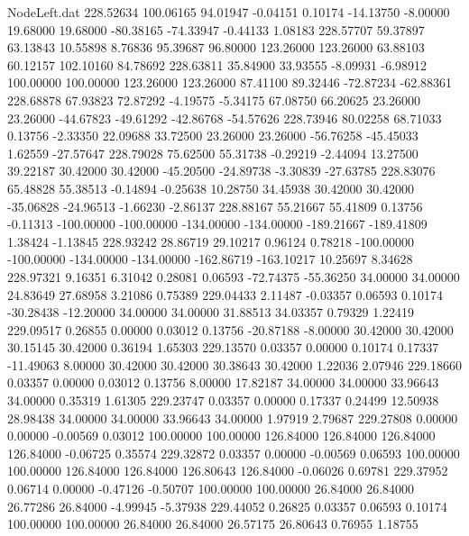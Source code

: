 \begin{filecontents}{NodeLeft.dat}
 228.52634  100.06165   94.01947    -0.04151    0.10174  -14.13750   -8.00000   19.68000   19.68000  -80.38165  -74.33947   -0.44133    1.08183
 228.57707   59.37897   63.13843    10.55898    8.76836   95.39687   96.80000  123.26000  123.26000   63.88103   60.12157  102.10160   84.78692
 228.63811   35.84900   33.93555    -8.09931   -6.98912  100.00000  100.00000  123.26000  123.26000   87.41100   89.32446  -72.87234  -62.88361
 228.68878   67.93823   72.87292    -4.19575   -5.34175   67.08750   66.20625   23.26000   23.26000  -44.67823  -49.61292  -42.86768  -54.57626
 228.73946   80.02258   68.71033     0.13756   -2.33350   22.09688   33.72500   23.26000   23.26000  -56.76258  -45.45033    1.62559  -27.57647
 228.79028   75.62500   55.31738    -0.29219   -2.44094   13.27500   39.22187   30.42000   30.42000  -45.20500  -24.89738   -3.30839  -27.63785
 228.83076   65.48828   55.38513    -0.14894   -0.25638   10.28750   34.45938   30.42000   30.42000  -35.06828  -24.96513   -1.66230   -2.86137
 228.88167   55.21667   55.41809     0.13756   -0.11313 -100.00000 -100.00000 -134.00000 -134.00000 -189.21667 -189.41809    1.38424   -1.13845
 228.93242   28.86719   29.10217     0.96124    0.78218 -100.00000 -100.00000 -134.00000 -134.00000 -162.86719 -163.10217   10.25697    8.34628
 228.97321    9.16351    6.31042     0.28081    0.06593  -72.74375  -55.36250   34.00000   34.00000   24.83649   27.68958    3.21086    0.75389
 229.04433    2.11487   -0.03357     0.06593    0.10174  -30.28438  -12.20000   34.00000   34.00000   31.88513   34.03357    0.79329    1.22419
 229.09517    0.26855    0.00000     0.03012    0.13756  -20.87188   -8.00000   30.42000   30.42000   30.15145   30.42000    0.36194    1.65303
 229.13570    0.03357    0.00000     0.10174    0.17337  -11.49063    8.00000   30.42000   30.42000   30.38643   30.42000    1.22036    2.07946
 229.18660    0.03357    0.00000     0.03012    0.13756    8.00000   17.82187   34.00000   34.00000   33.96643   34.00000    0.35319    1.61305
 229.23747    0.03357    0.00000     0.17337    0.24499   12.50938   28.98438   34.00000   34.00000   33.96643   34.00000    1.97919    2.79687
 229.27808    0.00000    0.00000    -0.00569    0.03012  100.00000  100.00000  126.84000  126.84000  126.84000  126.84000   -0.06725    0.35574
 229.32872    0.03357    0.00000    -0.00569    0.06593  100.00000  100.00000  126.84000  126.84000  126.80643  126.84000   -0.06026    0.69781
 229.37952    0.06714    0.00000    -0.47126   -0.50707  100.00000  100.00000   26.84000   26.84000   26.77286   26.84000   -4.99945   -5.37938
 229.44052    0.26825    0.03357     0.06593    0.10174  100.00000  100.00000   26.84000   26.84000   26.57175   26.80643    0.76955    1.18755

\end{filecontents}
